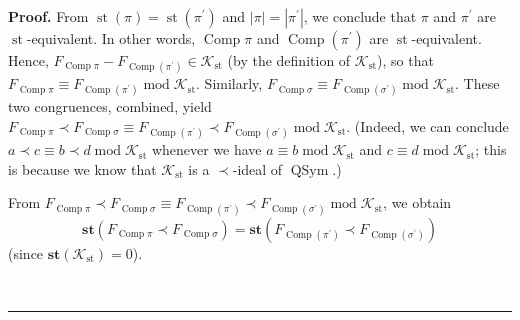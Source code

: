 \documentclass[numbers=enddot,12pt,final,onecolumn,notitlepage]{scrartcl}%
\theoremstyle{definition}
\newenvironment{proof}[1][Proof]{\noindent\textbf{#1.} }{\ \rule{0.5em}{0.5em}}
\newenvironment{verlong}{}{}
\begin{document}
\begin{verlong}
\begin{proof}
From $\operatorname*{st}\left(  \pi\right)  =\operatorname*{st}\left(
\pi^{\prime}\right)  $ and $\left\vert \pi\right\vert =\left\vert \pi^{\prime
}\right\vert $, we conclude that $\pi$ and $\pi^{\prime}$ are
$\operatorname*{st}$-equivalent. In other words, $\operatorname*{Comp}\pi$ and
$\operatorname*{Comp}\left(  \pi^{\prime}\right)  $ are $\operatorname*{st}%
$-equivalent. Hence, $F_{\operatorname*{Comp}\pi}-F_{\operatorname*{Comp}%
\left(  \pi^{\prime}\right)  }\in\mathcal{K}_{\operatorname*{st}}$ (by the
definition of $\mathcal{K}_{\operatorname*{st}}$), so that
$F_{\operatorname*{Comp}\pi}\equiv F_{\operatorname*{Comp}\left(  \pi^{\prime
}\right)  }\operatorname{mod}\mathcal{K}_{\operatorname*{st}}$. Similarly,
$F_{\operatorname*{Comp}\sigma}\equiv F_{\operatorname*{Comp}\left(
\sigma^{\prime}\right)  }\operatorname{mod}\mathcal{K}_{\operatorname*{st}}$.
These two congruences, combined, yield $F_{\operatorname*{Comp}\pi}\left.
\prec\right.  F_{\operatorname*{Comp}\sigma}\equiv F_{\operatorname*{Comp}%
\left(  \pi^{\prime}\right)  }\left.  \prec\right.  F_{\operatorname*{Comp}%
\left(  \sigma^{\prime}\right)  }\operatorname{mod}\mathcal{K}%
_{\operatorname*{st}}$. (Indeed, we can conclude $a\left.  \prec\right.
c\equiv b\left.  \prec\right.  d\operatorname{mod}\mathcal{K}%
_{\operatorname*{st}}$ whenever we have $a\equiv b\operatorname{mod}%
\mathcal{K}_{\operatorname*{st}}$ and $c\equiv d\operatorname{mod}%
\mathcal{K}_{\operatorname*{st}}$; this is because we know that $\mathcal{K}%
_{\operatorname*{st}}$ is a $\left.  \prec\right.  $-ideal of
$\operatorname*{QSym}$.)

From $F_{\operatorname*{Comp}\pi}\left.  \prec\right.  F_{\operatorname*{Comp}%
\sigma}\equiv F_{\operatorname*{Comp}\left(  \pi^{\prime}\right)  }\left.
\prec\right.  F_{\operatorname*{Comp}\left(  \sigma^{\prime}\right)
}\operatorname{mod}\mathcal{K}_{\operatorname*{st}}$, we obtain%
\begin{equation}
\mathbf{st}\left(  F_{\operatorname*{Comp}\pi}\left.  \prec\right.
F_{\operatorname*{Comp}\sigma}\right)  =\mathbf{st}\left(
F_{\operatorname*{Comp}\left(  \pi^{\prime}\right)  }\left.  \prec\right.
F_{\operatorname*{Comp}\left(  \sigma^{\prime}\right)  }\right)
\label{pf.thm.dendri.K.ideal.steq}%
\end{equation}
(since $\mathbf{st}\left(  \mathcal{K}_{\operatorname*{st}}\right)  =0$).


\end{proof}
\end{verlong}
\end{document}
